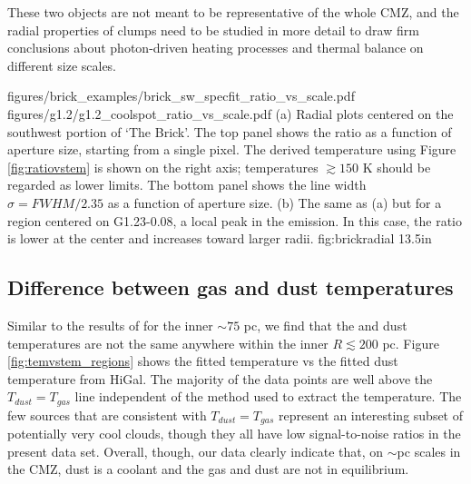 These two objects are not meant to be representative of the whole CMZ, and the
radial properties of clumps need to be studied in more detail to draw firm
conclusions about photon-driven heating processes and thermal balance on
different size scales.  

\FigureTwo
{figures/brick_examples/brick_sw_specfit_ratio_vs_scale.pdf}
{figures/g1.2/g1.2_coolspot_ratio_vs_scale.pdf}
{ (a) Radial plots centered on the southwest portion of `The Brick'.
The top panel shows the ratio \Rone as a function of aperture size, starting
from a single pixel.
The derived temperature using Figure \ref{fig:ratiovstem} is shown on the right
axis; temperatures $\gtrsim150$ K should be regarded as lower limits.
The bottom panel shows the line width $\sigma = FWHM/2.35$
as a function of aperture size.  
(b) The same as (a) but for a region centered on G1.23-0.08, a local
peak in the \para \threeohthree emission.  In this case,
the ratio \Rone is lower at the center and increases toward larger radii.
}
{fig:brickradial}
{1}{3.5in}



\subsection{Difference between gas and dust temperatures}
Similar to the results of \citet{Ao2013a} for the inner $\sim75$ pc, we find
that the \para and dust temperatures are not the same anywhere within the
inner $R\lesssim200$ pc.  Figure \ref{fig:temvstem_regions} shows the fitted \para
temperature vs the fitted dust temperature from HiGal.  The majority of the
\formaldehyde data points are well above the $T_{dust}=T_{gas}$ line
independent of the method used to extract the temperature.  The few sources
that are consistent with $T_{dust}=T_{gas}$ represent an interesting subset
of potentially very cool clouds, though they all have low signal-to-noise
ratios in the present data set.  Overall, though, our data clearly indicate
that, on $\sim$pc scales in the CMZ, dust is a coolant and the gas and dust are
not in equilibrium.


